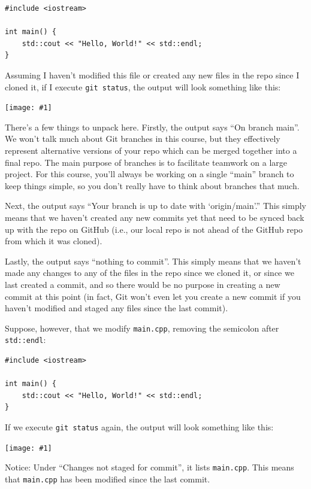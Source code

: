 \documentclass{article}
\newcommand{\imagewithdefaults}[1]{\texttt{[image: \#1]}}
\begin{document}
\begin{verbatim}
#include <iostream>

int main() {
    std::cout << "Hello, World!" << std::endl;
}
\end{verbatim}

Assuming I haven't modified this file or created any new files in the repo since I cloned it, if I execute \texttt{git status}, the output will look something like this:

\imagewithdefaults{res/fresh-git-status.png}

There's a few things to unpack here. Firstly, the output says ``On branch main''. We won't talk much about Git branches in this course, but they effectively represent alternative versions of your repo which can be merged together into a final repo. The main purpose of branches is to facilitate teamwork on a large project. For this course, you'll always be working on a single ``main'' branch to keep things simple, so you don't really have to think about branches that much.

Next, the output says ``Your branch is up to date with `origin/main'.'' This simply means that we haven't created any new commits yet that need to be synced back up with the repo on GitHub (i.e., our local repo is not ahead of the GitHub repo from which it was cloned).

Lastly, the output says ``nothing to commit''. This simply means that we haven't made any changes to any of the files in the repo since we cloned it, or since we last created a commit, and so there would be no purpose in creating a new commit at this point (in fact, Git won't even let you create a new commit if you haven't modified and staged any files since the last commit).

Suppose, however, that we modify \texttt{main.cpp}, removing the semicolon after \texttt{std::endl}:

\clearpage

\begin{verbatim}
#include <iostream>

int main() {
    std::cout << "Hello, World!" << std::endl;
}
\end{verbatim}

If we execute \texttt{git status} again, the output will look something like this:

\imagewithdefaults{res/git-status-modified.png}

Notice: Under ``Changes not staged for commit'', it lists \texttt{main.cpp}. This means that \texttt{main.cpp} has been modified since the last commit.
\end{document}
